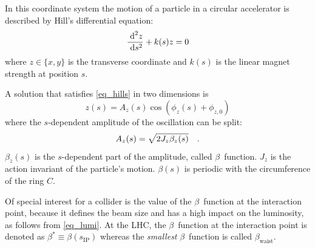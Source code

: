 In this coordinate system the motion of a particle in a circular accelerator is described by Hill's
differential equation:
%
\begin{equation}
    \frac{\;\text{d}^2 z}{\;\text{d} s^2} + k(s)z = 0
    \label{eq_hills}
\end{equation}
%
where $z \in \{x,y\}$ is the transverse coordinate and $k(s)$ is the linear magnet strength at
position $s$.

A solution that satisfies \eqref{eq_hills} in two dimensions is
%
\begin{equation}
    z(s) = A_z(s) \cos\left(\phi_z(s) + \phi_{z,0} \right)
    \label{eq_betatron_osc}
\end{equation}
%
where the $s$-dependent amplitude of the oscillation can be split:
%
\begin{equation}
    A_z(s) = \sqrt{2J_z \beta_z(s)}
    \quad .
    \label{eq_betatron_ampl}
\end{equation}
%
$\beta_z(s)$ is the $s$-dependent part of the amplitude, called $\beta$~function.
$J_z$ is the action invariant of the particle's motion.
$\beta(s)$ is periodic with the circumference of the ring $C$.

Of special interest for a collider is the value of the $\beta$~function at the interaction point,
 because it defines the beam size and
has a high impact on the luminosity, as follows from \eqref{eq_lumi}.
At the LHC, the $\beta$~function at the interaction point is denoted as $\beta^* \equiv \beta(s_\text{IP})$
whereas the \emph{smallest} $\beta$~function is called $\beta_\text{waist}$.

